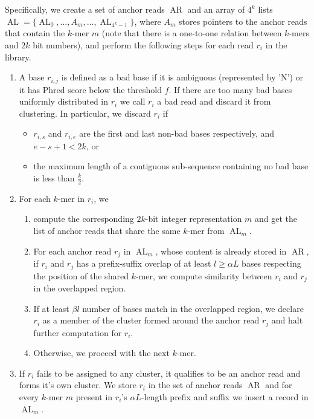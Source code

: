 \documentclass[a4paper]{article}
\DeclareMathOperator{\AR}{AR}
\DeclareMathOperator{\AL}{AL}
\begin{document}
Specifically, we create a set of anchor reads $\AR$ and an array
of $4^{k}$ lists $\AL=\{\AL_0, \ldots, A_m, \ldots, \AL_{4^k-1}\}$,
where $A_m$ stores pointers to the anchor reads that contain the $k$-mer $m$
(note that there is a one-to-one relation between $k$-mers and $2k$ bit numbers),
and perform the following steps for each read $r_i$ in the library.


\begin{enumerate}
  \setlength{\itemsep}{1pt}
  \setlength{\parskip}{0pt}
  \setlength{\parsep}{0pt}

\item A base $r_{i,j}$ is defined as a bad base if it is ambiguous
(represented by 'N') or it has Phred score below the threshold
$f$. If there are too many bad bases uniformly distributed in $r_i$
we call $r_i$ a bad read and discard it from clustering.
In particular, we discard $r_i$ if

\begin{itemize}
\item $r_{i,s}$ and $r_{i,e}$ are the first and last non-bad bases
respectively, and $e-s+1 < 2k$, or



\item the maximum length of a contiguous sub-sequence containing no bad base is less than $\frac{k}{2}$.

\end{itemize}

\item For each $k$-mer in $r_i$, we

  \begin{enumerate}
  \setlength{\itemsep}{1pt}
  \setlength{\parskip}{0pt}
  \setlength{\parsep}{0pt}
  \item compute the corresponding $2k$-bit integer
  representation $m$ and get the list of anchor reads that share
  the same $k$-mer from $\AL_m$.
  \item For each anchor read $r_j$ in $\AL_m$,
  whose content is already stored in $\AR$,
  if $r_i$ and $r_j$ has a prefix-suffix overlap of at least $l \ge \alpha L$ bases
  respecting the position
    of the shared $k$-mer, we compute similarity between $r_i$ and $r_j$
    in the overlapped region.
  \item If at least $\beta l$ number of bases match
  in the overlapped region,
  we declare $r_i$ as a member of the cluster formed around the
    anchor read $r_j$ and halt further computation for $r_i$.
  \item Otherwise, we proceed with the next $k$-mer.
  \end{enumerate}

\item If $r_i$ fails to be assigned to any cluster, it
qualifies to be an anchor read and forms it's own cluster. We store $r_i$
in the set of anchor reads $\AR$ and
for every $k$-mer $m$ present in $r_i$'s
$\alpha L$-length prefix and suffix we insert a record in $\AL_{m}$.
\end{enumerate}
\end{document}
